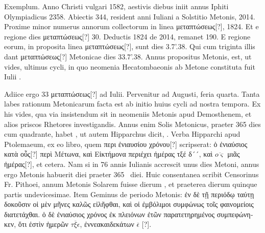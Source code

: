 Exemplum.
Anno Christi
vulgari 1582, aestivis diebus iniit annus Iphiti
Olympiadicus 2358.
Abiectis 344, resident anni
Iuliani a Solstitio Metonis, 2014.
Proxime minor
numerus annorum collectorum in linea \textgreek{μεταπτώσεως[?]},
1824.
Et e regione dies \textgreek{μεταπτώσεως[?]} 30.
Deductis 1824 de 2014, remanet 190.
E regione
eorum, in proposita linea \textgreek{μεταπτώσεως[?]}, sunt dies
3.7'.38.
Qui cum triginta illis dant \textgreek{μεταπτώσεως[?]}
Metonicae dies 33.7'.38.
Annus propositus Metonis,
est, ut vides, ultimus cycli, in quo neomenia
Hecatombaeonis ab Metone constituta fuit
Iulii .

Adiice ergo 33 \textgreek{μεταπτώσεως[?]}
 ad  Iulii.
Pervenitur ad
 Augusti, feria quarta.
Tanta labes rationum Metonicarum facta
est ab initio huius cycli ad nostra tempora.
Ex his vides, qua via
insistendum sit in neomeniis Metonis apud Demosthenem, et alios
priscos Rhetores investigandis.
Annus enim Solis Metonicus, praeter
365 dies cum quadrante, habet , ut autem Hipparchus dicit,
 .
Verba
Hipparchi apud Ptolemaeum, ex eo libro, quem \textgreek{περι ἐνιαυσίου χρόνου[?]}
scripserat: \textgreek{ὁ ἐνιαύσιος κατὰ οὖς[?] περὶ Μέτωνα,
 καὶ Εἰκτήμονα περιέχει ἡμέρας
τξέ δ´´, καὶ} $\overline{o\varsigma}$
 \textgreek{μιᾶς ἡμέρας[?]}, et cetera.
Nam si in 76 annis Iulianis accrescit
unus dies Metoni, annus ergo Metonis habuerit  diei praeter
 365~
diei.
Huic consentanea scribit Censorinus Fr. %
Pithoei, annum Metonis
Solarem fuisse dierum , et praeterea dierum quinque
partis undevicesimae.
Item Geminus de periodo Metonis: \textgreek{ἐν δὲ
τῇ περιόδῳ ταύτῃ δοκοῦσιν οἱ μὲν μῆνες καλῶς εἰλῆφθαι, καὶ οἱ ἐμβόλιμοι
συμφώνως τοῖς φαινομείοις διατετάχθαι. ὁ δὲ ἐνιαύσιος χρόνος ἐκ πλειόνων
ἐτῶν παρατετηρημένος συμπεφώνηκεν, ὅτι ἐστὶν ἡμερῶν}
 $\overline{\tau\xi\epsilon}$,
 \textgreek{ἐννεακαιδεκάτων} $\overline\epsilon$ [?].
